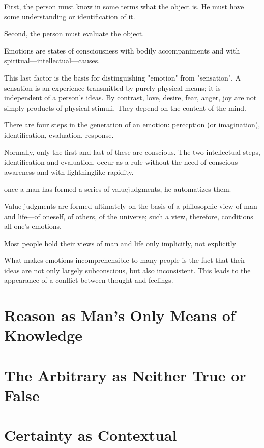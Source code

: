         First, the person must know in some terms what the object is. He must have some understanding or identification of it.
        
        Second, the person must evaluate the object.
        
        Emotions are states of consciousness with bodily accompaniments and with spiritual—intellectual—causes.
        
        This last factor is the basis for distinguishing "emotion" from "sensation". A sensation is an experience transmitted by purely physical means; it is independent of a person's ideas. By contrast, love, desire, fear, anger, joy are not simply products of physical stimuli. They depend on the content of the mind.
        
        There are four steps in the generation of an emotion: perccption (or imagination), identification, evaluation, response.
        
        Normally, only the first and last of these are conscious. The two intellectual steps, identification and evaluation, occur as a rule without the need of conscious awareness and with lightninglike rapidity.
        
        once a man has formed a series of valuejudgments, he automatizes them.
        
        Value-judgments are formed ultimately on the basis of a philosophic view of man and life—of oneself, of others, of the universe; such a view, therefore, conditions all one's emotions.
        
        Most people hold their views of man and life only implicitly, not explicitly
        
        What makes emotions incomprehensible to many people is the fact that their ideas are not only largely subconscious, but also inconsistent. This leads to the appearance of a conflict between thought and feelings.

    \section{Reason as Man's Only Means of Knowledge}

    \section{The Arbitrary as Neither True or False}

    \section{Certainty as Contextual}